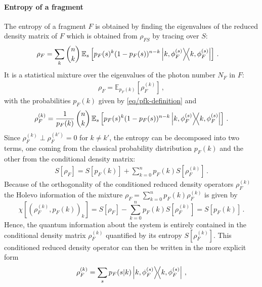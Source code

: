 \paragraph*{Entropy of a fragment}
The entropy of a fragment $F$ is obtained by finding the
eigenvalues of the reduced density matrix of $F$ which is obtained from
$\rho_{FS}$ by tracing over $S$:
%
\begin{align}
\rho_F &= \sum_{k} \binom{n}{k}\,
	\mathbb{E}_{s}\left[p_F(s)^k
	(1-p_F(s))^{n-k}
	\ket{k,\phi^{(s)}_F}\!\!\bra{k,\phi^{(s)}_F}
	\right]
\,.
\end{align}
It is a statistical mixture over the eigenvalues of the photon
number $N_F$ in $F$:
%
\begin{align}
	\rho_F = \mathbb{E}_{p_F(k)}\left[\rho_F^{(k)}\right]\, ,
\end{align}
%
with the probabilities $p_F(k)$ given by \cref{eq/pfk-definition} and
%
\begin{equation}
\rho_F^{(k)} =
	\frac{1}{p_F(k)}\,\binom{n}{k}\,
	\mathbb{E}_{s}\left[
	p_F(s)^k
	(1-p_F(s))^{n-k}
	\ket{k,\phi^{(s)}_F}\!\!\bra{k,\phi^{(s)}_F}
	\right]
\,.
\end{equation}
Since $\rho_F^{(k)} \perp \rho_F^{(k')} = 0$ for $k\neq k'$, the entropy 
can be decomposed into two terms, one coming from the classical
probability distribution $p_F(k)$ and the other from the conditional
density matrix:
%
\begin{align}
S[\rho_F] = S[p_F(k)] + 
	\sum_{k=0}^n p_F(k) S[\rho_F^{(k)}]
\,.
\end{align}
Because of the orthogonality of the conditioned reduced density
operators $\rho_F^{(k)}$ the Holevo information
of the mixture $\rho_F = \sum_{k=0}^n p_F(k) \rho_F^{(k)}
$ is given by
\begin{equation}
	\chi\left[\left(\rho_F^{(k)},p_F(k)\right)_k\right] = S[\rho_F] -
\sum_{k=0}^n p_F(k) S[\rho_F^{(k)}]
=S[p_F(k)]\,.
\end{equation}
Hence, the quantum information about the system
is entirely contained in the conditional density matrix  $\rho_F^{(k)}$
quantified by its entropy $S[\rho_F^{(k)}]$. This conditioned reduced
density operator can then be written in the
more explicit form
%
\begin{equation}
\rho_F^{(k)} = \sum_s p_F(s|k)
\ket{k,\phi^{(s)}_F}\!\!\bra{k,\phi^{(s)}_F}\, ,
\end{equation}
